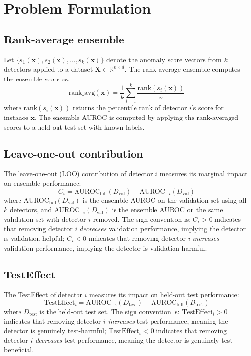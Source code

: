 \section{Problem Formulation}
\label{sec:formulation}

\subsection{Rank-average ensemble}

Let $\{s_1(\mathbf{x}), s_2(\mathbf{x}), \ldots, s_k(\mathbf{x})\}$ denote the anomaly score vectors from $k$ detectors applied to a dataset $\mathbf{X} \in \mathbb{R}^{n \times d}$. The rank-average ensemble computes the ensemble score as:
\begin{equation}
\text{rank\_avg}(\mathbf{x}) = \frac{1}{k} \sum_{i=1}^{k} \frac{\text{rank}(s_i(\mathbf{x}))}{n}
\label{eq:rank_avg}
\end{equation}
where $\text{rank}(s_i(\mathbf{x}))$ returns the percentile rank of detector $i$'s score for instance $\mathbf{x}$. The ensemble AUROC is computed by applying the rank-averaged scores to a held-out test set with known labels.

\subsection{Leave-one-out contribution}

The leave-one-out (LOO) contribution of detector $i$ measures its marginal impact on ensemble performance:
\begin{equation}
C_i = \text{AUROC}_{\text{full}}(D_{\text{val}}) - \text{AUROC}_{-i}(D_{\text{val}})
\label{eq:loo_contribution}
\end{equation}
where $\text{AUROC}_{\text{full}}(D_{\text{val}})$ is the ensemble AUROC on the validation set using all $k$ detectors, and $\text{AUROC}_{-i}(D_{\text{val}})$ is the ensemble AUROC on the same validation set with detector $i$ removed. The sign convention is: $C_i > 0$ indicates that removing detector $i$ \emph{decreases} validation performance, implying the detector is validation-helpful; $C_i < 0$ indicates that removing detector $i$ \emph{increases} validation performance, implying the detector is validation-harmful.

\subsection{TestEffect}

The TestEffect of detector $i$ measures its impact on held-out test performance:
\begin{equation}
\text{TestEffect}_i = \text{AUROC}_{-i}(D_{\text{test}}) - \text{AUROC}_{\text{full}}(D_{\text{test}})
\label{eq:test_effect}
\end{equation}
where $D_{\text{test}}$ is the held-out test set. The sign convention is: $\text{TestEffect}_i > 0$ indicates that removing detector $i$ \emph{increases} test performance, meaning the detector is genuinely test-harmful; $\text{TestEffect}_i < 0$ indicates that removing detector $i$ \emph{decreases} test performance, meaning the detector is genuinely test-beneficial.

